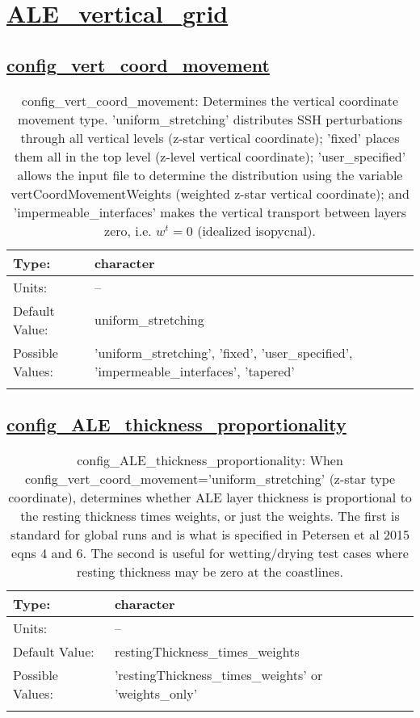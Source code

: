 \section[ALE\_vertical\_grid]{\hyperref[sec:nm_tab_ALE_vertical_grid]{ALE\_vertical\_grid}}
\label{sec:nm_sec_ALE_vertical_grid}
\subsection[config\_vert\_coord\_movement]{\hyperref[sec:nm_tab_ALE_vertical_grid]{config\_vert\_coord\_movement}}
\label{subsec:nm_sec_config_vert_coord_movement}
\begin{center}
\begin{longtable}{| p{2.0in} || p{4.0in} |}
    \hline
    Type: & character \\
    \hline
    Units: & -- \\
    \hline
    Default Value: & uniform\_stretching \\
    \hline
    Possible Values: & 'uniform\_stretching', 'fixed', 'user\_specified', 'impermeable\_interfaces', 'tapered' \\
    \hline
    \caption{config\_vert\_coord\_movement: Determines the vertical coordinate movement type. 'uniform\_stretching' distributes SSH perturbations through all vertical levels (z-star vertical coordinate); 'fixed' places them all in the top level (z-level vertical coordinate); 'user\_specified' allows the input file to determine the distribution using the variable vertCoordMovementWeights (weighted z-star vertical coordinate); and 'impermeable\_interfaces' makes the vertical transport between layers zero, i.e. $w^t=0$ (idealized isopycnal).}
\end{longtable}
\end{center}
\subsection[config\_ALE\_thickness\_proportionality]{\hyperref[sec:nm_tab_ALE_vertical_grid]{config\_ALE\_thickness\_proportionality}}
\label{subsec:nm_sec_config_ALE_thickness_proportionality}
\begin{center}
\begin{longtable}{| p{2.0in} || p{4.0in} |}
    \hline
    Type: & character \\
    \hline
    Units: & -- \\
    \hline
    Default Value: & restingThickness\_times\_weights \\
    \hline
    Possible Values: & 'restingThickness\_times\_weights' or 'weights\_only' \\
    \hline
    \caption{config\_ALE\_thickness\_proportionality: When config\_vert\_coord\_movement='uniform\_stretching' (z-star type coordinate), determines whether ALE layer thickness is proportional to the resting thickness times weights, or just the weights. The first is standard for global runs and is what is specified in Petersen et al 2015 eqns 4 and 6. The second is useful for wetting/drying test cases where resting thickness may be zero at the coastlines.}
\end{longtable}
\end{center}
